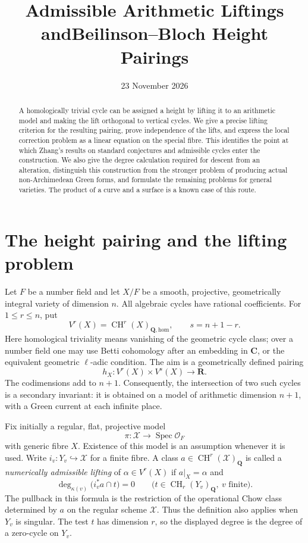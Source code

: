 \documentclass[11pt,a4paper]{article}
\title{Admissible Arithmetic Liftings and\newline Beilinson--Bloch Height Pairings}
\author{}
\date{23 November 2026}
\theoremstyle{definition}
\numberwithin{equation}{section}
\newcommand{\CH}{\operatorname{CH}}
\newcommand{\Q}{\mathbf Q}
\newcommand{\R}{\mathbf R}
\newcommand{\C}{\mathbf C}
\newcommand{\Spec}{\operatorname{Spec}}
\newcommand{\homol}{\mathrm{hom}}
\begin{document}
\maketitle
\begin{abstract}
A homologically trivial cycle can be assigned a height by lifting it to an arithmetic model and making the lift orthogonal to vertical cycles. We give a precise lifting criterion for the resulting pairing, prove independence of the lifts, and express the local correction problem as a linear equation on the special fibre. This identifies the point at which Zhang's results on standard conjectures and admissible cycles enter the construction. We also give the degree calculation required for descent from an alteration, distinguish this construction from the stronger problem of producing actual non-Archimedean Green forms, and formulate the remaining problems for general varieties. The product of a curve and a surface is a known case of this route.
\end{abstract}

\tableofcontents

\section{The height pairing and the lifting problem}\label{sec:zhang-introduction}

Let $F$ be a number field and let $X/F$ be a smooth, projective, geometrically integral variety of dimension $n$. All algebraic cycles have rational coefficients. For $1\leq r\leq n$, put
\[
 V^r(X)=\CH^r(X)_{\Q,\homol},\qquad s=n+1-r.
\]
Here homological triviality means vanishing of the geometric cycle class; over a number field one may use Betti cohomology after an embedding in $\C$, or the equivalent geometric $\ell$-adic condition. The aim is a geometrically defined pairing
\begin{equation}\label{eq:zhang-target}
 h_X:V^r(X)\times V^s(X)\longrightarrow\R.
\end{equation}
The codimensions add to $n+1$. Consequently, the intersection of two such cycles is a secondary invariant: it is obtained on a model of arithmetic dimension $n+1$, with a Green current at each infinite place.

Fix initially a regular, flat, projective model
\[
 \pi:\mathcal X\longrightarrow\Spec\mathcal O_F
\]
with generic fibre $X$. Existence of this model is an assumption whenever it is used. Write $i_v:Y_v\hookrightarrow\mathcal X$ for a finite fibre. A class $a\in\CH^r(\mathcal X)_\Q$ is called a \emph{numerically admissible lifting} of $\alpha\in V^r(X)$ if $a|_X=\alpha$ and
\begin{equation}\label{eq:zhang-vertical-orthogonality}
 \deg_{\kappa(v)}\bigl(i_v^*a\cap t\bigr)=0
 \qquad\bigl(t\in\CH_r(Y_v)_\Q,\ v\text{ finite}\bigr).
\end{equation}
The pullback in this formula is the restriction of the operational Chow class determined by $a$ on the regular scheme $\mathcal X$. Thus the definition also applies when $Y_v$ is singular. The test $t$ has dimension $r$, so the displayed degree is the degree of a zero-cycle on $Y_v$.
\end{document}
